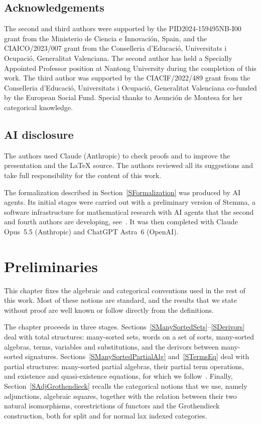 \documentclass[a4paper, reqno]{amsbook}
\theoremstyle{plain}
\theoremstyle{definition}
\begin{document}
\section{Acknowledgements}
The second and third authors were supported by the PID2024-159495NB-I00 grant from the
Ministerio de Ciencia e Innovaci\'{o}n, Spain, and the CIAICO/2023/007 grant from the
Conselleria d'Educaci\'{o}, Universitats i Ocupaci\'{o}, Generalitat Valenciana.
The second author has held a Specially Appointed Professor position at Nantong University during the completion of this work.
The third author was supported by the CIACIF/2022/489 grant from the Conselleria d'Educaci\'{o}, Universitats i Ocupaci\'{o}, Generalitat Valenciana co-funded by the European Social Fund.
Special thanks to Asunci\'{o}n de Montesa for her categorical knowledge.

\section{AI disclosure}\label{SAIDisclosure}
The authors used Claude (Anthropic) to check proofs and to improve the presentation and the \LaTeX{} source.
The authors reviewed all its suggestions and take full responsibility for the content of this work.

The formalization described in Section~\ref{SFormalization} was produced by AI agents.
Its initial stages were carried out with a preliminary version of Stemma, a software infrastructure for mathematical research with AI agents that the second and fourth authors are developing, see~\cite{VagoCosme2026}.
It was then completed with Claude Opus~5.5 (Anthropic) and ChatGPT Astra~6 (OpenAI).

\chapter{Preliminaries}\label{SPreliminaries}

This chapter fixes the algebraic and categorical conventions used in the rest of this work.
Most of these notions are standard, and the results that we state without proof are well known or follow directly from the definitions.

The chapter proceeds in three stages.
Sections~\ref{SManySortedSets}--\ref{SDerivors} deal with total structures: many-sorted sets, words on a set of sorts, many-sorted algebras, terms, variables and substitutions, and the derivors between many-sorted signatures.
Sections~\ref{SManySortedPartialAlg} and~\ref{STermsEq} deal with partial structures: many-sorted partial algebras, their partial term operations, and existence and quasi-existence equations, for which we follow~\cite{Burmeister1986, Burmeister2002}.
Finally, Section~\ref{SAdjGrothendieck} recalls the categorical notions that we use, namely adjunctions, algebraic squares, together with the relation between their two natural isomorphisms, corestrictions of functors and the Grothendieck construction, both for split and for normal lax indexed categories.
\end{document}
